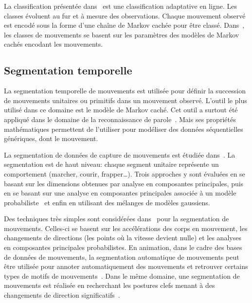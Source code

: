La classification présentée dans~\cite{kulic08} est une classification adaptative en ligne. Les classes évoluent
au fur et à mesure des observations. Chaque mouvement observé est encodé sous la forme d'une chaîne
de Markov cachée pour être classé.
Dans~\cite{takano05}, les classes de mouvements se basent sur les paramètres des modèles
de Markov cachés encodant les mouvements.

\subsection{Segmentation temporelle}
La segmentation temporelle de mouvements est utilisée pour définir la succession
de mouvements unitaires ou primitifs dans un mouvement observé. L'outil le
plus utilisé dans ce domaine est le modèle de Markov caché.
Cet outil a surtout été appliqué dans le domaine de la reconnaissance 
de parole~\cite{rabiner89}. Mais ses propriétés mathématiques
permettent de l'utiliser pour modéliser des données séquentielles génériques, dont le mouvement.

La segmentation de données de capture de mouvements est étudiée dans~\cite{barbic04}.
La segmentation est de haut niveau: chaque segment unitaire représente 
un comportement (marcher, courir, frapper\ldots). Trois approches y sont évaluées
en se basant sur les dimensions obtenues par analyse en composantes principales,
puis en se basant sur une analyse en composantes principales associée à un modèle probabiliste~\cite{tipping99} 
et enfin en utilisant des mélanges de modèles gaussiens.

Des techniques très simples sont considérées dans~\cite{field08} pour la segmentation
de mouvements. Celles-ci se basent sur les accélérations des corps en mouvement, les changements de directions
(les points où la vitesse devient nulle)
et les analyses en composantes principales probabilistes.
En animation, dans le cadre des bases de données de mouvements,
la segmentation automatique de mouvements peut être utilisée
pour annoter automatiquement des mouvements et retrouver certains types de motifs de mouvements~\cite{so06, beaudoin08}.
Dans le même domaine, une segmentation de mouvements est réalisée en recherchant les 
postures clefs menant à des changements de direction significatifs~\cite{so05}.


